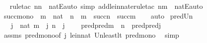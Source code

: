 \begin{isabellebody}
%
\isadelimproof
\ \ %
\endisadelimproof
%
\isatagproof
{}\isamarkupfalse%
{\isacharparenleft}{\kern0pt}rule{\isacharunderscore}{\kern0pt}tac\ n{\isacharequal}{\kern0pt}{\isachardoublequoteopen}n{\isachardoublequoteclose}\ \ natE{\isacharcomma}{\kern0pt}auto\ simp\ add{\isacharcolon}{\kern0pt}le{\isacharunderscore}{\kern0pt}in{\isacharunderscore}{\kern0pt}nat{\isacharcomma}{\kern0pt}erule{\isacharunderscore}{\kern0pt}tac\ n{\isacharequal}{\kern0pt}{\isachardoublequoteopen}m{\isachardoublequoteclose}\ \ natE{\isacharcomma}{\kern0pt}auto{\isacharparenright}{\kern0pt}%
\endisatagproof
{\isafoldproof}%
%
\isadelimproof
\isanewline
%
\endisadelimproof
\isanewline
{}\isamarkupfalse%
\ succ{\isacharunderscore}{\kern0pt}mono\ {\isacharcolon}{\kern0pt}\ {\isachardoublequoteopen}m\ {\isasymin}\ nat\ {\isasymLongrightarrow}\ n\ {\isasymle}\ m\ {\isasymLongrightarrow}\ succ{\isacharparenleft}{\kern0pt}n{\isacharparenright}{\kern0pt}\ {\isasymle}\ succ{\isacharparenleft}{\kern0pt}m{\isacharparenright}{\kern0pt}{\isachardoublequoteclose}\isanewline
%
\isadelimproof
\ \ %
\endisadelimproof
%
\isatagproof
{}\isamarkupfalse%
\ auto%
\endisatagproof
{\isafoldproof}%
%
\isadelimproof
\isanewline
%
\endisadelimproof
\isanewline
{}\isamarkupfalse%
\ pred{}{\isacharunderscore}{\kern0pt}Un{\isacharcolon}{\kern0pt}\ \isanewline
\ \ \ {\isachardoublequoteopen}j\ {\isasymin}\ nat{\isachardoublequoteclose}\ {\isachardoublequoteopen}m\ {\isasymle}\ j{\isachardoublequoteclose}\ {\isachardoublequoteopen}n\ {\isasymle}\ j{\isachardoublequoteclose}\ \isanewline
\ \ \ {\isachardoublequoteopen}pred{\isacharparenleft}{\kern0pt}pred{\isacharparenleft}{\kern0pt}m\ {\isasymunion}\ n{\isacharparenright}{\kern0pt}{\isacharparenright}{\kern0pt}\ {\isasymle}\ pred{\isacharparenleft}{\kern0pt}pred{\isacharparenleft}{\kern0pt}j{\isacharparenright}{\kern0pt}{\isacharparenright}{\kern0pt}{\isachardoublequoteclose}\ \isanewline
%
\isadelimproof
\ \ %
\endisadelimproof
%
\isatagproof
{}\isamarkupfalse%
\ assms\ pred{\isacharunderscore}{\kern0pt}mono{\isacharbrackleft}{\kern0pt}of\ {\isachardoublequoteopen}j{\isachardoublequoteclose}{\isacharbrackright}{\kern0pt}\ le{\isacharunderscore}{\kern0pt}in{\isacharunderscore}{\kern0pt}nat\ Un{\isacharunderscore}{\kern0pt}least{\isacharunderscore}{\kern0pt}lt\ pred{\isacharunderscore}{\kern0pt}mono\ \isamarkupfalse%
\ simp%
\endisatagproof
{\isafoldproof}%
%
\isadelimproof
\isanewline
%
\endisadelimproof

\end{isabellebody}
